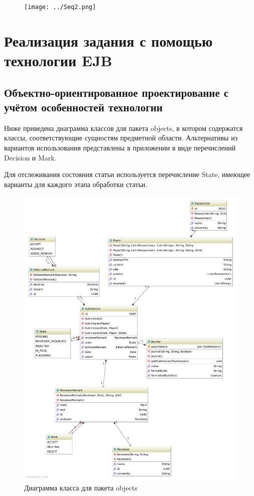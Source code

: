 \begin{figure}[H]
\centering
\texttt{[image: ../Seq2.png]}
\caption{}
\end{figure}

\section{Реализация задания с помощью технологии EJB}

\subsection{Объектно-ориентированное проектирование с учётом особенностей технологии}

Ниже приведена диаграмма классов для пакета objects, в котором содержатся классы, соответствующие сущностям предметной области. Альтернативы из вариантов использования представлены в приложении в виде перечислений Decision и Mark.

Для отслеживания состояния статьи используется перечисление State, имеющее варианты для каждого этапа обработки статьи.

\begin{figure}[H]
\centering
\includegraphics[width=\textwidth]{diagram.pdf}
\caption{Диаграмма класса для пакета objects}
\end{figure}

